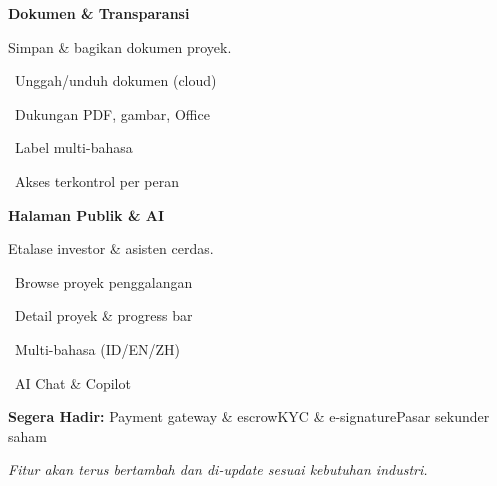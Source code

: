\documentclass[a4paper]{article}
\begin{document}
\noindent
\begin{minipage}[t]{0.485\textwidth}
    \colorbox{OrangePrimary}{%
        \begin{minipage}{\dimexpr\textwidth-2\fboxsep\relax}
            {\fontsize{10}{13}\selectfont\bfseries\color{White} Dokumen \& Transparansi}
        \end{minipage}}\par
    \vspace{4pt}
    {\fontsize{9}{12}\selectfont\color{TextDark}%
    Simpan \& bagikan dokumen proyek.\par\vspace{3pt}
    \textbullet\ Unggah/unduh dokumen (cloud)\par\vspace{2pt}%
    \textbullet\ Dukungan PDF, gambar, Office\par\vspace{2pt}%
    \textbullet\ Label multi-bahasa\par\vspace{2pt}%
    \textbullet\ Akses terkontrol per peran}%

\end{minipage}%
\hfill
\begin{minipage}[t]{0.485\textwidth}
    \colorbox{EmeraldDark}{%
        \begin{minipage}{\dimexpr\textwidth-2\fboxsep\relax}
            {\fontsize{10}{13}\selectfont\bfseries\color{White} Halaman Publik \& AI}
        \end{minipage}}\par
    \vspace{4pt}
    {\fontsize{9}{12}\selectfont\color{TextDark}%
    Etalase investor \& asisten cerdas.\par\vspace{3pt}
    \textbullet\ Browse proyek penggalangan\par\vspace{2pt}%
    \textbullet\ Detail proyek \& progress bar\par\vspace{2pt}%
    \textbullet\ Multi-bahasa (ID/EN/ZH)\par\vspace{2pt}%
    \textbullet\ AI Chat \& Copilot}%

\end{minipage}

\vspace{8pt}

{\setlength{\fboxsep}{8pt}\setlength{\fboxrule}{0pt}%
\noindent\colorbox{BlueBg}{%
    \begin{minipage}{\dimexpr\textwidth-2\fboxsep\relax}
        {\fontsize{9}{12}\selectfont\bfseries\color{BlueDark} Segera Hadir:}\enspace
        {\fontsize{9}{12}\selectfont\color{TextDark} Payment gateway \& escrow\enspace\textcolor{BluePrimary}{\textbullet}\enspace KYC \& e-signature\enspace\textcolor{BluePrimary}{\textbullet}\enspace Pasar sekunder saham}\par\vspace{3pt}
        {\fontsize{8.5}{11}\selectfont\color{TextLight}\textit{Fitur akan terus bertambah dan di-update sesuai kebutuhan industri.}}
    \end{minipage}}}
\end{document}
